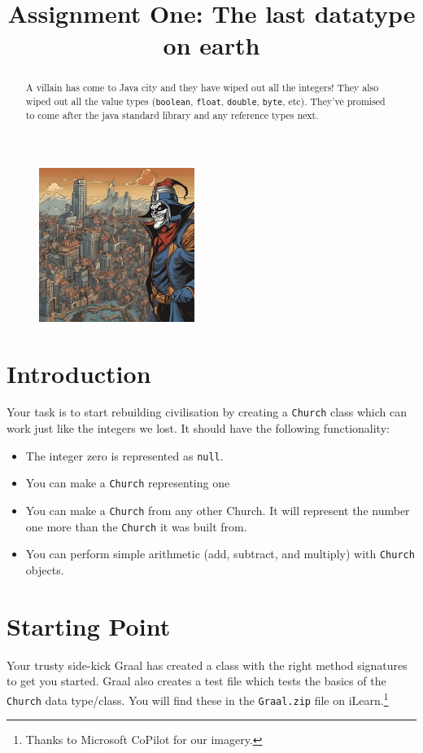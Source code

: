 \documentclass[twoside=false,DIV=14]{scrartcl}
\title{\color{redish} \vspace{-2em}Assignment One: The last datatype on earth}
\begin{document}
{\color{blackish}\maketitle}\vspace{-2em}
\begin{abstract}
    A villain has come to Java city and they have wiped out all the integers!  They also wiped out all the value types (\lstinline{boolean}, \lstinline{float}, \lstinline{double}, \lstinline{byte}, etc).  They've promised to come after the java standard library and any reference types next.
\end{abstract}

\begin{figure} %
  \centering
  \includegraphics[width=0.45\textwidth]{villain.jpeg}
\end{figure}

\section{Introduction}
Your task is to start rebuilding civilisation by creating a \lstinline{Church} class which can work just like the integers we lost.  It should have the following functionality:
\begin{itemize}
  \item The integer zero is represented as \verb|null|.
  \item You can make a \lstinline{Church} representing one
  \item You can make a \verb|Church| from any other Church.  It will represent the number one more than the \verb|Church| it was built from.
  \item You can perform simple arithmetic (add, subtract, and multiply) with \lstinline{Church} objects.
\end{itemize}

\section{Starting Point}
Your trusty side-kick Graal has created a class with the right method signatures to get you started. Graal also creates a test file which tests the basics of the \verb+Church+ data type/class. You will find these in the \lstinline{Graal.zip} file on iLearn.\footnote{Thanks to Microsoft CoPilot for our imagery.}
\end{document}
